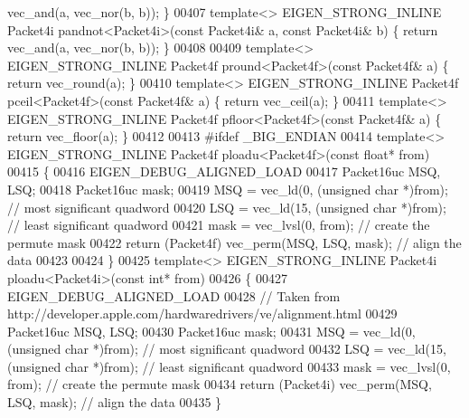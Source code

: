 \begin{DoxyCode}
{      vec\_and(a, vec\_nor(b, b)); \}
00407 \textcolor{keyword}{template}<> EIGEN\_STRONG\_INLINE Packet4i pandnot<Packet4i>(\textcolor{keyword}{const} Packet4i& a, \textcolor{keyword}{const} Packet4i& b) \{ \textcolor{keywordflow}{return} 
      vec\_and(a, vec\_nor(b, b)); \}
00408 
00409 \textcolor{keyword}{template}<> EIGEN\_STRONG\_INLINE Packet4f pround<Packet4f>(\textcolor{keyword}{const} Packet4f& a) \{ \textcolor{keywordflow}{return} vec\_round(a); \}
00410 \textcolor{keyword}{template}<> EIGEN\_STRONG\_INLINE Packet4f pceil<Packet4f>(\textcolor{keyword}{const}  Packet4f& a) \{ \textcolor{keywordflow}{return} vec\_ceil(a); \}
00411 \textcolor{keyword}{template}<> EIGEN\_STRONG\_INLINE Packet4f pfloor<Packet4f>(\textcolor{keyword}{const} Packet4f& a) \{ \textcolor{keywordflow}{return} vec\_floor(a); \}
00412 
00413 \textcolor{preprocessor}{#ifdef \_BIG\_ENDIAN}
00414 \textcolor{keyword}{template}<> EIGEN\_STRONG\_INLINE Packet4f ploadu<Packet4f>(\textcolor{keyword}{const} \textcolor{keywordtype}{float}* from)
00415 \{
00416   EIGEN\_DEBUG\_ALIGNED\_LOAD
00417   Packet16uc MSQ, LSQ;
00418   Packet16uc mask;
00419   MSQ = vec\_ld(0, (\textcolor{keywordtype}{unsigned} \textcolor{keywordtype}{char} *)from);          \textcolor{comment}{// most significant quadword}
00420   LSQ = vec\_ld(15, (\textcolor{keywordtype}{unsigned} \textcolor{keywordtype}{char} *)from);         \textcolor{comment}{// least significant quadword}
00421   mask = vec\_lvsl(0, from);                        \textcolor{comment}{// create the permute mask}
00422   \textcolor{keywordflow}{return} (Packet4f) vec\_perm(MSQ, LSQ, mask);           \textcolor{comment}{// align the data}
00423 
00424 \}
00425 \textcolor{keyword}{template}<> EIGEN\_STRONG\_INLINE Packet4i ploadu<Packet4i>(\textcolor{keyword}{const} \textcolor{keywordtype}{int}* from)
00426 \{
00427   EIGEN\_DEBUG\_ALIGNED\_LOAD
00428   \textcolor{comment}{// Taken from http://developer.apple.com/hardwaredrivers/ve/alignment.html}
00429   Packet16uc MSQ, LSQ;
00430   Packet16uc mask;
00431   MSQ = vec\_ld(0, (\textcolor{keywordtype}{unsigned} \textcolor{keywordtype}{char} *)from);          \textcolor{comment}{// most significant quadword}
00432   LSQ = vec\_ld(15, (\textcolor{keywordtype}{unsigned} \textcolor{keywordtype}{char} *)from);         \textcolor{comment}{// least significant quadword}
00433   mask = vec\_lvsl(0, from);                        \textcolor{comment}{// create the permute mask}
00434   \textcolor{keywordflow}{return} (Packet4i) vec\_perm(MSQ, LSQ, mask);    \textcolor{comment}{// align the data}
00435 \}
}
\end{DoxyCode}
